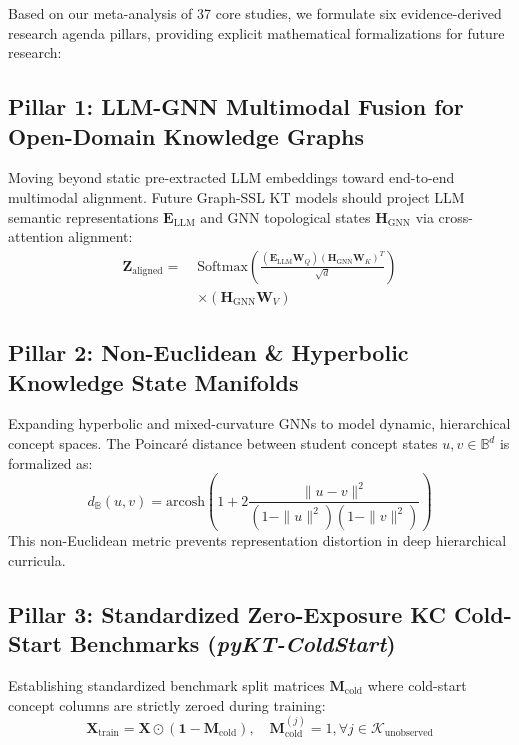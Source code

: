 ﻿\documentclass[10pt,journal,compsoc]{IEEEtran}
\begin{document}
Based on our meta-analysis of 37 core studies, we formulate six evidence-derived research agenda pillars, providing explicit mathematical formalizations for future research:

\subsection{Pillar 1: LLM-GNN Multimodal Fusion for Open-Domain Knowledge Graphs}
Moving beyond static pre-extracted LLM embeddings toward end-to-end multimodal alignment. Future Graph-SSL KT models should project LLM semantic representations $\mathbf{E}_{\text{LLM}}$ and GNN topological states $\mathbf{H}_{\text{GNN}}$ via cross-attention alignment:
\begin{equation}
\begin{split}
\mathbf{Z}_{\text{aligned}} = \; & \text{Softmax}\left(\frac{(\mathbf{E}_{\text{LLM}}\mathbf{W}_Q)(\mathbf{H}_{\text{GNN}}\mathbf{W}_K)^T}{\sqrt{d}}\right) \\
& \times (\mathbf{H}_{\text{GNN}}\mathbf{W}_V)
\end{split}
\end{equation}

\subsection{Pillar 2: Non-Euclidean \& Hyperbolic Knowledge State Manifolds}
Expanding hyperbolic and mixed-curvature GNNs to model dynamic, hierarchical concept spaces. The Poincaré distance between student concept states $u, v \in \mathbb{B}^d$ is formalized as:
\begin{equation}
d_{\mathbb{B}}(u, v) = \text{arcosh}\left(1 + 2 \frac{\|u - v\|^2}{(1 - \|u\|^2)(1 - \|v\|^2)}\right)
\end{equation}
This non-Euclidean metric prevents representation distortion in deep hierarchical curricula.

\subsection{Pillar 3: Standardized Zero-Exposure KC Cold-Start Benchmarks (\emph{pyKT-ColdStart})}
Establishing standardized benchmark split matrices $\mathbf{M}_{\text{cold}}$ where cold-start concept columns are strictly zeroed during training:
\begin{equation}
\mathbf{X}_{\text{train}} = \mathbf{X} \odot (\mathbf{1} - \mathbf{M}_{\text{cold}}), \quad \mathbf{M}_{\text{cold}}^{(j)} = 1, \forall j \in \mathcal{K}_{\text{unobserved}}
\end{equation}
\end{document}
